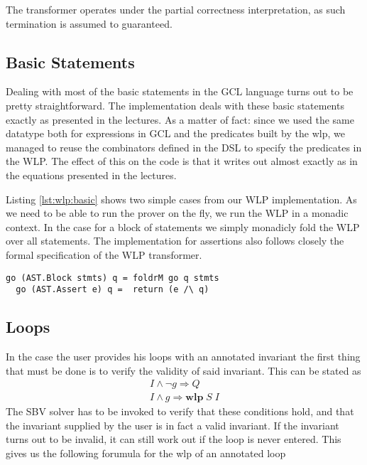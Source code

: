 \documentclass[]{scrartcl}
\newcommand{\WLP}[2]{\ensuremath{\mathbf{wlp}\;#1\;#2}}
\begin{document}
The transformer operates under the partial correctness interpretation, as such
termination is assumed to guaranteed.

\subsection{Basic Statements}
Dealing with most of the basic statements in the GCL language turns out to
be pretty straightforward. The implementation deals with these basic statements
exactly as presented in the lectures.
As a matter of fact: since we used the same datatype both for expressions in GCL
and the predicates built by the wlp, we managed to reuse the combinators defined
in the DSL to specify the predicates in the WLP. The effect of this on the code
is that it writes out almost exactly as in the equations presented in the lectures.

Listing \ref{lst:wlp:basic} shows two simple cases from our WLP implementation.
As we need to be able to run the prover on the fly, we run the WLP in a monadic context.
In the case for a block of statements we simply monadicly fold the WLP over all statements.
The implementation for assertions also follows closely the formal specification of the
WLP transformer. 

\begin{lstlisting}[caption=WLP implementation example, label=lst:wlp:basic]
  go (AST.Block stmts) q = foldrM go q stmts
  go (AST.Assert e) q =  return (e /\ q)
\end{lstlisting}

\subsection{Loops}
In the case the user provides his loops with an annotated invariant the first
thing that must be done is to verify the validity of said invariant.
This can be stated as
\begin{align}
  I \land \neg g \Rightarrow Q \\
  I \land g \Rightarrow \WLP{S}{I}
\end{align}
The SBV solver has to be invoked to verify that these conditions hold, and that
the invariant supplied by the user is in fact a valid invariant.
If the invariant turns out to be invalid, it can still work out if the loop
is never entered. This gives us the following forumula for the wlp of an annotated
loop
\end{document}
